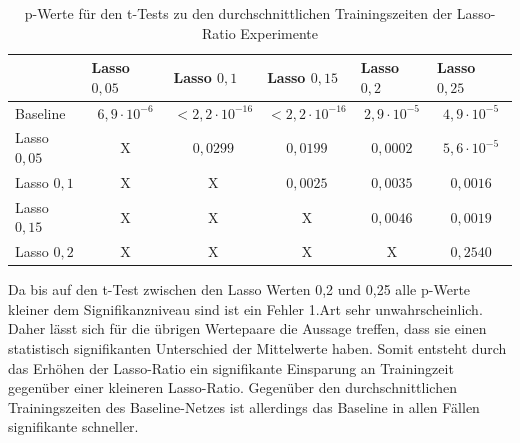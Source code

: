 \begin{table}[]
\centering
\begin{tabular}{l|c|c|c|c|c|}
\cline{2-6}
& \multicolumn{1}{l|}{Lasso $0,05$} & \multicolumn{1}{l|}{Lasso $0,1$} & \multicolumn{1}{l|}{Lasso $0,15$} & \multicolumn{1}{l|}{Lasso $0,2$} & \multicolumn{1}{l|}{Lasso $0,25$} \\ \hline
\multicolumn{1}{|l|}{Baseline}                             & $6,9\cdot10^{-6}$   & $<2,2\cdot10^{-16} $   & $<2,2\cdot 10^{-16}$     & $2,9\cdot 10^{-5}$   & $4,9\cdot10^{-5}$    \\ \hline
\multicolumn{1}{|l|}{Lasso $0,05$}                             & X                               & $0,0299$                         & $0,0199$                          & $0,0002$                         & $5,6\cdot 10^{-5}$    \\ \hline
\multicolumn{1}{|l|}{Lasso $0,1$}                             & X                               & X                              & $0,0025$                          & $0,0035$                         & $0,0016$                          \\ \hline
\multicolumn{1}{|l|}{Lasso $0,15$}   & X                               & X                              & X                               & $0,0046$                         & $0,0019$                          \\ \hline
\multicolumn{1}{|l|}{Lasso $0,2$}                             & X                               & X                              & X                               & X                              & \cellcolor[HTML]{FE0000}$0,2540$                          \\ \hline
\end{tabular}
\caption{p-Werte für den t-Tests zu den durchschnittlichen Trainingszeiten der Lasso-Ratio Experimente}
\label{tab:lasso1}
\end{table}
Da bis auf den t-Test zwischen den Lasso Werten 0,2 und 0,25 alle p-Werte kleiner dem Signifikanzniveau sind ist ein Fehler 1.Art sehr unwahrscheinlich. Daher lässt sich für die übrigen Wertepaare die Aussage treffen, dass sie einen statistisch signifikanten Unterschied der Mittelwerte haben. Somit entsteht durch das Erhöhen der Lasso-Ratio ein signifikante Einsparung an Trainingzeit gegenüber einer kleineren Lasso-Ratio. Gegenüber den durchschnittlichen Trainingszeiten des Baseline-Netzes ist allerdings das Baseline in allen Fällen signifikante schneller.  


